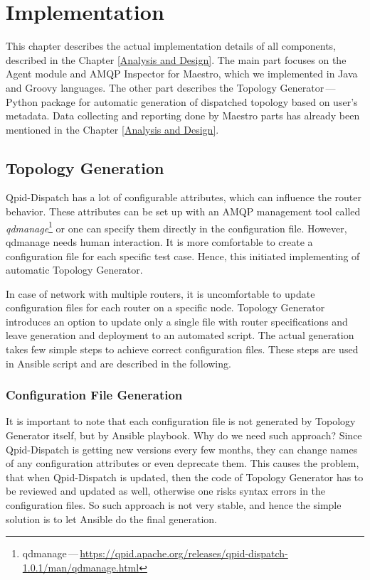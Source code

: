 \chapter{Implementation}
\label{Implementation}
This chapter describes the actual implementation details of all components, described in the Chapter \ref{Analysis and Design}. The main part focuses on the Agent module and AMQP Inspector for Maestro, which we implemented in Java and Groovy languages. The other part describes the Topology Generator\,---\,Python package for automatic generation of dispatched topology based on user's metadata. Data collecting and reporting done by Maestro parts has already been mentioned in the Chapter \ref{Analysis and Design}.

\section{Topology Generation}
Qpid-Dispatch has a lot of configurable attributes, which can influence the router behavior. These attributes can be set up with an AMQP management tool called \emph{qdmanage}\footnote{qdmanage\,---\,\url{https://qpid.apache.org/releases/qpid-dispatch-1.0.1/man/qdmanage.html}} or one can specify them directly in the configuration file. However, qdmanage needs human interaction. It is more comfortable to create a configuration file for each specific test case. Hence, this initiated implementing of automatic Topology Generator.

In case of network with multiple routers, it is uncomfortable to update configuration files for each router on a specific node. Topology Generator introduces an option to update only a single file with router specifications and leave generation and deployment to an automated script. The actual generation takes few simple steps to achieve correct configuration files. These steps are used in Ansible script and are described in the following.

\subsection{Configuration File Generation}
It is important to note that each configuration file is not generated by Topology Generator itself, but by Ansible playbook. Why do we need such approach? Since Qpid-Dispatch is getting new versions every few months, they can change names of any configuration attributes or even deprecate them. This causes the problem, that when Qpid-Dispatch is updated, then the code of Topology Generator has to be reviewed and updated as well, otherwise one risks syntax errors in the configuration files. So such approach is not very stable, and hence the simple solution is to let Ansible do the final generation.

